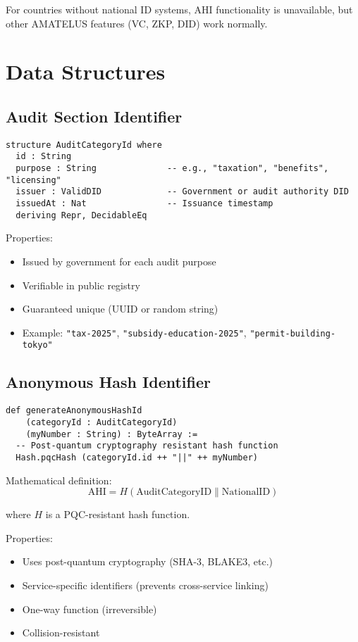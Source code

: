 For countries without national ID systems, AHI functionality is unavailable, but other AMATELUS features
(VC, ZKP, DID) work normally.

\section{Data Structures}

\subsection{Audit Section Identifier}

\begin{verbatim}
structure AuditCategoryId where
  id : String
  purpose : String              -- e.g., "taxation", "benefits", "licensing"
  issuer : ValidDID             -- Government or audit authority DID
  issuedAt : Nat                -- Issuance timestamp
  deriving Repr, DecidableEq
\end{verbatim}

Properties:
\begin{itemize}
  \item Issued by government for each audit purpose
  \item Verifiable in public registry
  \item Guaranteed unique (UUID or random string)
  \item Example: \texttt{"tax-2025"}, \texttt{"subsidy-education-2025"}, \texttt{"permit-building-tokyo"}
\end{itemize}

\subsection{Anonymous Hash Identifier}

\begin{verbatim}
def generateAnonymousHashId
    (categoryId : AuditCategoryId)
    (myNumber : String) : ByteArray :=
  -- Post-quantum cryptography resistant hash function
  Hash.pqcHash (categoryId.id ++ "||" ++ myNumber)
\end{verbatim}

Mathematical definition:
\[
\text{AHI} = H(\text{AuditCategoryID} \parallel \text{NationalID})
\]

where $H$ is a PQC-resistant hash function.

Properties:
\begin{itemize}
  \item Uses post-quantum cryptography (SHA-3, BLAKE3, etc.)
  \item Service-specific identifiers (prevents cross-service linking)
  \item One-way function (irreversible)
  \item Collision-resistant
\end{itemize}

